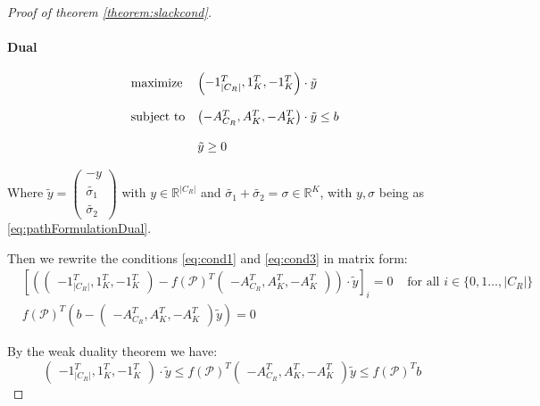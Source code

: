 \documentclass[14pt,a4paper]{article}
\theoremstyle{definition}
\numberwithin{equation}{subsection}
\begin{document}
\begin{proof}[Proof of theorem \ref{theorem:slackcond}]
 

 
 \paragraph{Dual}
 \begin{equation*}
 \begin{array}{ll@{}ll}
 \text{maximize}  &\left( \begin{matrix} -1_{|C_R|}^T, 1_K^T, -1_K^T  \end{matrix} \right)\cdot \tilde{y}   \\
 \\
 \text{subject to} 
 &\left( \begin{matrix} -A_{C_R}^T, A_K^T, -A_K^T \end{matrix} \right) \cdot \tilde{y} \leq  b  \\
 \\
 &\tilde{y} \geq 0
 \end{array}
 \label{eq:matrixformdual}
 \end{equation*}
 
 Where $\tilde{y} =\left( \begin{matrix} -y \\ \tilde{\sigma_1} \\ \tilde{\sigma_2}  \end{matrix} \right) $ with $y \in \mathbb{R}^{|C_R|}$  and $\tilde{\sigma_1} + \tilde{\sigma_2} = \sigma \in \mathbb{R}^{K}$, with $y,\sigma$ being as \eqref{eq:pathFormulationDual}.

 
 Then we rewrite the conditions \eqref{eq:cond1} and \eqref{eq:cond3} in matrix form:
\begin{align*}
&\left[ \left( \left( \begin{matrix} -1_{|C_R|}^T, 1_K^T, -1_K^T  \end{matrix} \right) - f(\mathcal{P})^T\left( \begin{matrix} -A_{C_R}^T, A_K^T, -A_K^T \end{matrix} \right) \right) \cdot \tilde{y}\right]_{i}= 0 & \text{ for all } i \in \{0,1\ldots,|C_R| \}\\
& f(\mathcal{P})^T\left( b - \left( \begin{matrix} -A_{C_R}^T, A_K^T, -A_K^T \end{matrix} \right)\tilde{y} \right) = 0 &
\end{align*}
 
 
 By the weak duality theorem we have: 
 $$\left( \begin{matrix} -1_{|C_R|}^T, 1_K^T, -1_K^T  \end{matrix} \right)\cdot \tilde{y} \leq  
 f(\mathcal{P})^T \left( \begin{matrix} -A_{C_R}^T, A_K^T, -A_K^T \end{matrix} \right)\tilde{y} \leq f(\mathcal{P})^Tb $$
 

\end{proof}
\end{document}
